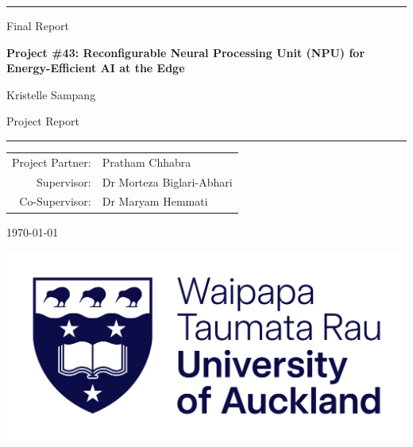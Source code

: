 \documentclass[12pt, a4paper, ukenglish]{article}
\newcommand\HRule{\noindent\rule{\linewidth}{2pt}}
\begin{document}
% 
\def\name{Kristelle Sampang}
\def\reportNumber{COMPSYS043-\the\year}

\thispagestyle{empty}

\begin{center}
    \vspace*{10mm}

    \vspace*{10mm}
    \HRule
    
    \vspace{0.5cm}
    Final Report
    \vspace{0.5cm}
    
    {\Large \textbf{Project \#43: Reconfigurable Neural Processing Unit (NPU) for Energy-Efficient AI at the Edge}}
    
    \vspace{1cm}
    {\large \name}
    
    \vspace{0.5cm}
    Project Report 
    
    \vspace{0.5cm}
    \HRule
\end{center}

\vfill
\begin{center}
    \begin{tabular}{r l}
        \addlinespace[1.5em]
        Project Partner: & Pratham Chhabra \\
        \addlinespace[1.5em]
        Supervisor: & Dr Morteza Biglari-Abhari \\
        \addlinespace[1.5em]
        Co-Supervisor: & Dr Maryam Hemmati
    \end{tabular}
\end{center}

\vfill
\begin{center}
    \today
\end{center}

\vfill
\begin{center}
    \includegraphics[width=0.4\linewidth]{figures/UoA-Logo-Primary-RGB-Large.png}
\end{center}
\end{document}
